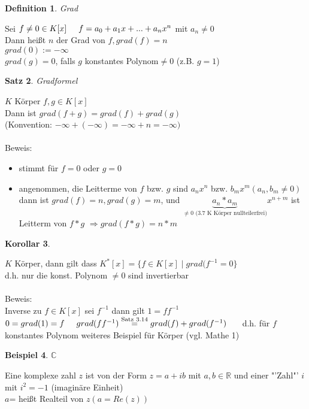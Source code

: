 \documentclass[a4paper,11pt]{article}
\newtheorem{definition}{Definition}[section]
\newtheorem{satz}[definition]{Satz}
\newtheorem{bsp}[definition]{Beispiel}
\newtheorem{koro}[definition]{Korollar}
\begin{document}
\begin{definition}
Grad
\end{definition}
Sei $f\neq 0\in K[x]\hspace{5mm}f=a_0+a_1x+...+a_nx^n$ mit $a_n\neq 0$ \\
Dann heißt $n$ der Grad von $f, grad(f)=n$ \\
$grad(0):=-\infty$ \\
$grad(g)=0$, falls $g$ konstantes Polynom$\neq0$ (z.B. $g=1$)
\begin{satz}
Gradformel
\end{satz}
$K$ Körper $f,g\in K[x]$ \\
Dann ist $grad(f+g)=grad(f)+grad(g)$ \\
(Konvention: $-\infty +(-\infty)=-\infty+n=-\infty)$ \\
\\
Beweis: \\
\begin{itemize}
\vspace{-5mm}
\item stimmt für $f=0$ oder $g=0$
\item angenommen, die Leitterme von $f$ bzw. $g$ sind $a_nx^n$ bzw. $b_mx^m (a_n,b_m\neq 0)$ dann ist $grad(f)=n, grad(g)=m$, und $\underbrace{a_n*a_m}_{\neq 0 \text{ (3.7 K Körper nullteilerfrei)}}x^{n+m}$ ist Leitterm von $f*g$
$\Rightarrow grad(f*g)=n*m$
\end{itemize}
\begin{koro}
\end{koro}
$K$ Körper, dann gilt dass $K^*[x]=\{f\in K[x]\mid grad(f^{-1}=0\}$ \\
d.h. nur die konst. Polynom $\neq0$ sind invertierbar \\
\\
Beweis: \\
Inverse zu $f\in K[x]$ sei $f^{-1}$ dann gilt $1=ff^{-1}$ \\
$0=grad(1)=f\hspace{5mm}grad(ff^{-1})\overset{\text{Satz 3.14}}{=}grad(f)+grad(f^{-1})\hspace{5mm}$ d.h. für $f$ konstantes Polynom weiteres Beispiel für Körper (vgl. Mathe 1)
\newpage
\begin{bsp}
$\mathbb{C}$
\end{bsp}
Eine komplexe zahl $z$ ist von der Form $z=a+ib$ mit $a,b\in\mathbb{R}$ und einer "'Zahl"' $i$ mit $i^2=-1$ (imaginäre Einheit) \\
$a$= heißt Realteil von $z (a=Re(z))$ \\
\end{document}
